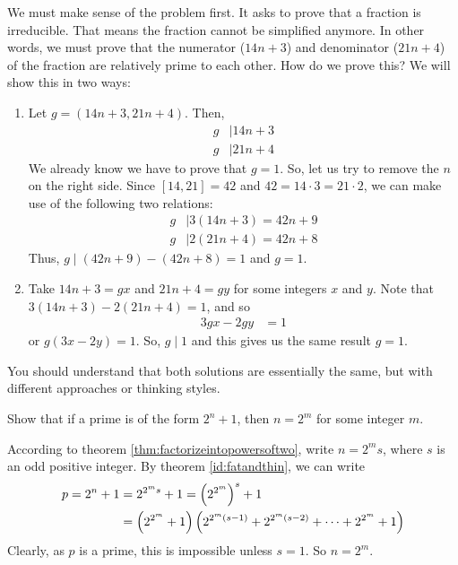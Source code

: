 \begin{solution}
	We must make sense of the problem first. It asks to prove that a fraction is irreducible. That means the fraction cannot be simplified anymore. In other words, we must prove that the numerator ($14n+3$) and denominator ($21n+4$) of the fraction are relatively prime to each other. How do we prove this? We will show this in two ways:
	\begin{enumerate}
		\item Let $g=(14n+3,21n+4)$. Then,
		\begin{align*}
			g & \mid 14n+3\\
			g & \mid 21n+4
		\end{align*}
	We already know we have to prove that $g=1$. So, let us try to remove the $n$ on the right side. Since $[14,21]=42$ and $42=14\cdot3=21\cdot2$, we can make use of the following two relations:
		\begin{align*}
			g & \mid 3(14n+3) = 42n+9\\
			g & \mid  2(21n+4)= 42n+8
		\end{align*}
	Thus, $g\mid (42n+9)-(42n+8)=1$ and $g=1$.

		\item Take $14n+3=gx$ and $21n+4=gy$ for some integers $x$ and $y$. Note that $3(14n+3)-2(21n+4) = 1$, and so
		\begin{align*}
		 3gx-2gy  & = 1
		\end{align*}
	or $g(3x-2y) = 1.$ So, $g\mid 1$ and this gives us the same result $g=1$.
	\end{enumerate}
\end{solution}

\begin{remark}
	You should understand that both solutions are essentially the same, but with different approaches or thinking styles.
\end{remark}

\begin{problem}\label{prob:prime=poweroftwoplusone}
	Show that if a prime is of the form $2^n+1$, then $n=2^m$ for some integer $m$.
\end{problem}

\begin{solution}
	According to theorem \autoref{thm:factorizeintopowersoftwo}, write $n=2^ms$, where $s$ is an odd positive integer. By theorem \eqref{id:fatandthin}, we can write
		\begin{align*}
			p = 2^n+1 &= 2^{2^{m}s}+1 = \left(2^{2^{m}}\right)^s+1\\
	   		  &=\left(2^{2^m}+1\right)\left(2^{2^{m}(s-1)}+2^{2^{m}(s-2)}+ \cdots + 2^{2^{m}}+1\right)
		\end{align*}
	Clearly, as $p$ is a prime, this is impossible unless $s=1$. So $n=2^m$.
\end{solution}

